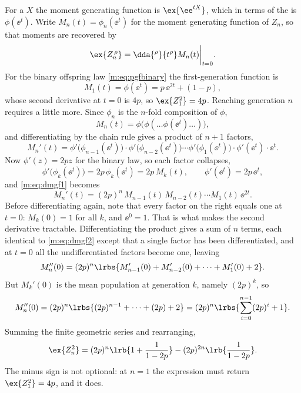For a \rv{} $X$ the moment generating function is $\ex{\ee^{tX}}$, which in terms
of the \pgf{} is $\phi(\ee^t)$. Write $M_n(t) = \phi_n(\ee^t)$ for the moment
generating function of $Z_n$, so that moments are recovered by
\begin{equation}
\label{m:eq:mgfmoments}
\ex{Z_n^{\,\rho}} = \dda{^{\rho}}{t^{\rho}}M_n(t)\bigg|_{t=0} .
\end{equation}
For the binary offspring law \cref{m:eq:pgfbinary} the first-generation function is
\begin{equation}
\label{m:eq:mgf1}
M_1(t) = \phi(\ee^t) = p\,\ee^{2t} + (1-p),
\end{equation}
whose second derivative at $t=0$ is $4p$, so $\ex{Z_1^2}=4p$. Reaching generation
$n$ requires a little more. Since $\phi_n$ is the $n$-fold composition of $\phi$,
\begin{equation*}
M_n(t) = \phi\bigl(\phi(\dots\phi(\ee^t)\dots)\bigr),
\end{equation*}
and differentiating by the chain rule gives a product of $n+1$ factors,
\begin{equation}
\label{m:eq:dmgf1}
M_n'(t) = \phi'\bigl(\phi_{n-1}(\ee^t)\bigr)\cdot\phi'\bigl(\phi_{n-2}(\ee^t)\bigr)
\cdots\phi'\bigl(\phi_1(\ee^t)\bigr)\cdot\phi'(\ee^t)\cdot\ee^t .
\end{equation}
Now $\phi'(z) = 2pz$ for the binary law, so each factor collapses,
\begin{equation*}
\phi'\bigl(\phi_k(\ee^t)\bigr) = 2p\,\phi_k(\ee^t) = 2p\,M_k(t),
\qquad
\phi'(\ee^t) = 2p\,\ee^t ,
\end{equation*}
and \cref{m:eq:dmgf1} becomes
\begin{equation}
\label{m:eq:dmgf2}
M_n'(t) = (2p)^n\,M_{n-1}(t)\,M_{n-2}(t)\cdots M_1(t)\,\ee^{2t} .
\end{equation}
Before differentiating again, note that every factor on the right equals one at
$t=0$: $M_k(0)=1$ for all $k$, and $\ee^0=1$. That is what makes the second
derivative tractable. Differentiating the product gives a sum of $n$ terms, each
identical to \cref{m:eq:dmgf2} except that a single factor has been differentiated,
and at $t=0$ all the undifferentiated factors become one, leaving
\begin{equation*}
M_n''(0) = (2p)^n\lrbs{M_{n-1}'(0) + M_{n-2}'(0) + \cdots + M_1'(0) + 2}.
\end{equation*}
But $M_k'(0)$ is the mean population at generation $k$, namely $(2p)^k$, so
\begin{equation*}
M_n''(0) = (2p)^n\lrbs{(2p)^{n-1} + \cdots + (2p) + 2}
= (2p)^n\lrbs{\sum_{i=0}^{n-1}(2p)^i + 1}.
\end{equation*}
Summing the finite geometric series and rearranging,
\begin{equation}
\label{m:eq:secondMoment}
\ex{Z_n^2} = (2p)^n\lrb{1+\frac{1}{1-2p}} - (2p)^{2n}\lrb{\frac{1}{1-2p}} .
\end{equation}
The minus sign is not optional: at $n=1$ the expression must return
$\ex{Z_1^2}=4p$, and it does.

